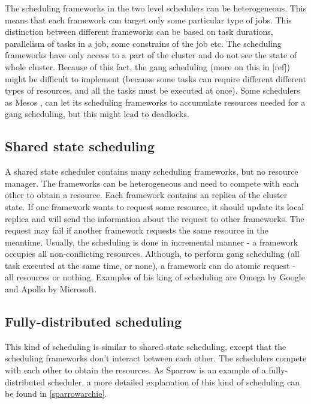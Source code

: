 \documentclass[11pt]{article}
\begin{document}
        The scheduling frameworks in the two level schedulers can be heterogeneous. This means that each framework can target only some particular type of jobs. This distinction between different frameworks can be based on task durations, parallelism of tasks in a job, some constrains of the job etc. The scheduling frameworks have only access to a part of the cluster and do not see the state of whole cluster. Because of this fact, the gang scheduling (more on this in [ref]) might be difficult to implement (because some tasks can require different different types of resources, and all the tasks must be executed at once). Some schedulers as Mesos \cite{mesos}, can let its scheduling frameworks to accumulate resources needed for a gang scheduling, but this might lead to deadlocks.
    
    \subsection{Shared state scheduling}

		A shared state scheduler contains many scheduling frameworks, but no resource manager. The frameworks can be heterogeneous and need to compete with each other to obtain a resource. Each framework contains an replica of the cluster state. If one framework wants to request some resource, it should update its local replica and will send the information about the request to other frameworks. The request may fail if another framework requests the same resource in the meantime. Usually, the scheduling is done in incremental manner - a framework occupies all non-conflicting resources. Although, to perform gang scheduling (all task executed at the same time, or none), a framework can do atomic request - all resources or nothing. Examples of his king of scheduling are Omega \cite{omega} by Google and Apollo \cite{apollo} by Microsoft.
    
    \subsection{Fully-distributed scheduling}
    	This kind of scheduling is similar to shared state scheduling, except that the scheduling frameworks don't interact between each other. The schedulers compete with each other to obtain the resources. As Sparrow is an example of a fully-distributed scheduler, a more detailed explanation of this kind of scheduling can be found in \ref{sparrowarchie}.%
        
\end{document}

